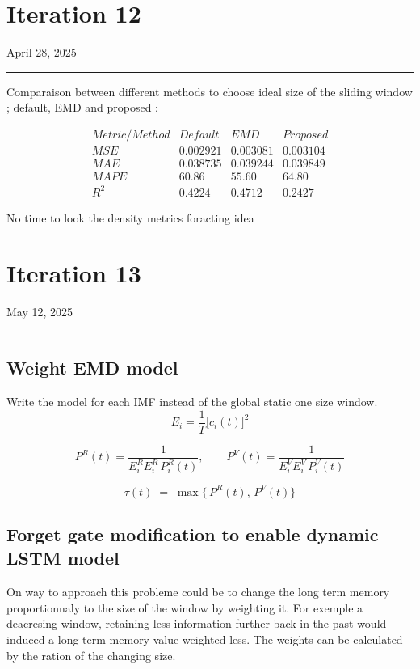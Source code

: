 \documentclass[letterpaper,11pt]{article}
\begin{document}
\newpage
\section*{Iteration 12}
\begin{flushright}
April 28, 2025
\end{flushright}
\hrule
\vspace{0.2in}

Comparaison between different methods to choose ideal size of the sliding window ; default, EMD and proposed :

\bigskip
\[
\begin{array}{cccc}
Metric/Method & Default & EMD & Proposed \\
MSE & 0.002921 & 0.003081 & 0.003104 \\
MAE & 0.038735 & 0.039244 & 0.039849 \\
MAPE & 60.86 & 55.60 & 64.80 \\
R^{2} & 0.4224 & 0.4712 & 0.2427
\end{array}
\]


\bigskip
No time to look the density metrics foracting idea




\newpage
\section*{Iteration 13}
\begin{flushright}
May 12, 2025
\end{flushright}
\hrule
\vspace{0.2in}

\subsection*{Weight EMD model}
Write the model for each IMF instead of the global static one size window.
  \[
    E_i = \frac{1}{T} \bigl[c_i(t)\bigr]^2
  \]

  \bigskip

  \[
    P^R(t) = \frac{1}{E_i^R E_i^R\,P_i^R(t)},
    \qquad
    P^V(t) = \frac{1}{E_i^V E_i^V\,P_i^V(t)}
  \]

  \bigskip

  \[
    \tau(t) \;=\; \max\bigl\{\,P^R(t),\,P^V(t)\bigr\}
  \]


\subsection*{Forget gate modification to enable dynamic LSTM model}
On way to approach this probleme could be to change the long term memory proportionnaly to the size of the window by weighting it.
For exemple a deacresing window, retaining less information further back in the past would induced a long term memory value weighted less.
The weights can be calculated by the ration of the changing size.\\
\end{document}

